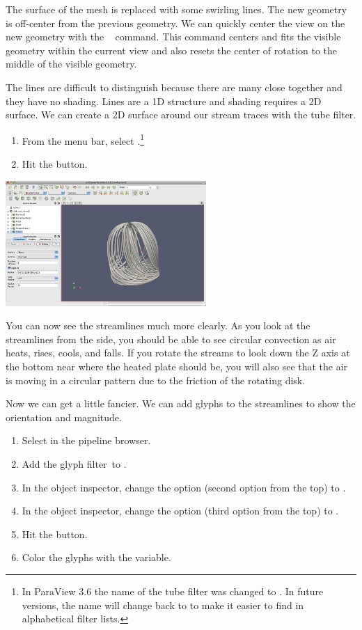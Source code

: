 The surface of the mesh is replaced with some swirling lines.  The new
geometry is off-center from the previous geometry.  We can quickly center
the view on the new geometry with the ~\resetCamera
command.  This command centers and fits the visible geometry within the
current view and also resets the center of rotation to the middle of the
visible geometry.

The lines are difficult to distinguish because there are many close
together and they have no shading.  Lines are a 1D structure and shading
requires a 2D surface.  We can create a 2D surface around our stream traces
with the tube filter.

\begin{enumerate}
  \restorecounter
\item From the menu bar, select  \ra {} \ra
  .\footnote{In ParaView 3.6 the name of the tube
    filter was changed to .  In future versions, the
    name will change back to  to make it easier to find in
    alphabetical filter lists.}
\item Hit the \apply button.
\end{enumerate}

\begin{inlinefig}
  \includegraphics[width=3in]{images/StreamTracer1}
\end{inlinefig}

You can now see the streamlines much more clearly.  As you look at the
streamlines from the side, you should be able to see circular convection as
air heats, rises, cools, and falls.  If you rotate the streams to look down
the Z axis at the bottom near where the heated plate should be, you will
also see that the air is moving in a circular pattern due to the friction
of the rotating disk.

Now we can get a little fancier.  We can add glyphs to the streamlines to
show the orientation and magnitude.

\begin{enumerate}
\item Select  in the pipeline browser.
\item Add the glyph filter~\glyph to .
\item In the object inspector, change the  option (second
  option from the top) to .
\item In the object inspector, change the  option (third
  option from the top) to .
\item Hit the \apply button.
\item Color the glyphs with the  variable.
\end{enumerate}

